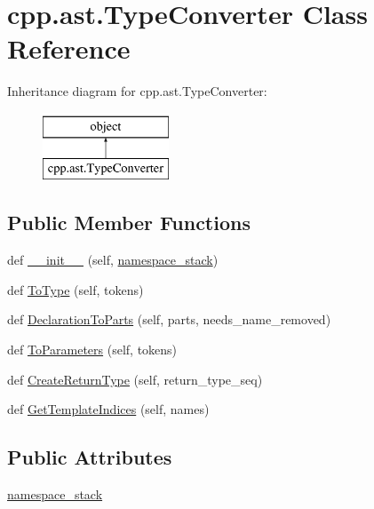 \hypertarget{classcpp_1_1ast_1_1TypeConverter}{}\section{cpp.\+ast.\+Type\+Converter Class Reference}
\label{classcpp_1_1ast_1_1TypeConverter}
Inheritance diagram for cpp.\+ast.\+Type\+Converter\+:\begin{figure}[H]
\begin{center}
\leavevmode
\includegraphics[height=2.000000cm]{classcpp_1_1ast_1_1TypeConverter}
\end{center}
\end{figure}
\subsection*{Public Member Functions}
\begin{DoxyCompactItemize}
\item 
def \mbox{\hyperlink{classcpp_1_1ast_1_1TypeConverter_ae6e75773d6722cdbb96d510a49cb633a}{\+\_\+\+\_\+init\+\_\+\+\_\+}} (self, \mbox{\hyperlink{classcpp_1_1ast_1_1TypeConverter_abb739f15c6cd0800e07c086c2b30833e}{namespace\+\_\+stack}})
\item 
def \mbox{\hyperlink{classcpp_1_1ast_1_1TypeConverter_aa6ea82e40cd30e5dfcd471ff144a19cf}{To\+Type}} (self, tokens)
\item 
def \mbox{\hyperlink{classcpp_1_1ast_1_1TypeConverter_a7c9d20d107c2bc0eb80afdf04957825f}{Declaration\+To\+Parts}} (self, parts, needs\+\_\+name\+\_\+removed)
\item 
def \mbox{\hyperlink{classcpp_1_1ast_1_1TypeConverter_aeaf27fb1890f65d7216703df610b46d5}{To\+Parameters}} (self, tokens)
\item 
def \mbox{\hyperlink{classcpp_1_1ast_1_1TypeConverter_a7e4d429131d9d5742ec44c78b61beb87}{Create\+Return\+Type}} (self, return\+\_\+type\+\_\+seq)
\item 
def \mbox{\hyperlink{classcpp_1_1ast_1_1TypeConverter_a7b5244be5a0caedd769ae866f8a182aa}{Get\+Template\+Indices}} (self, names)
\end{DoxyCompactItemize}
\subsection*{Public Attributes}
\begin{DoxyCompactItemize}
\item 
\mbox{\hyperlink{classcpp_1_1ast_1_1TypeConverter_abb739f15c6cd0800e07c086c2b30833e}{namespace\+\_\+stack}}
\end{DoxyCompactItemize}



